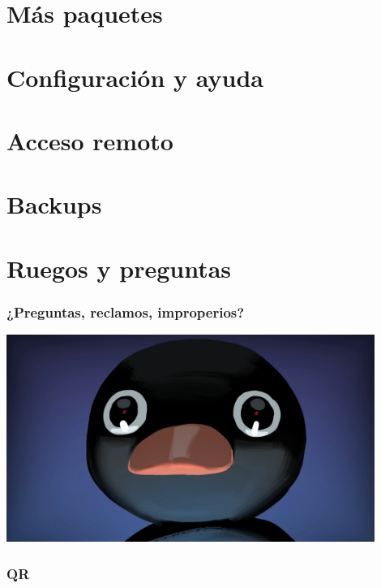 \documentclass[aspectratio=43]{beamer}
\begin{document}
\begin{frame}
    \frametitle{}
    
\end{frame}


\section{Más paquetes}

\begin{frame}
    \frametitle{}
    
\end{frame}


\section{Configuración y ayuda}

\begin{frame}
    \frametitle{}
    
\end{frame}


\section{Acceso remoto}


\begin{frame}
    \frametitle{}
    
\end{frame}



\section{Backups}

\begin{frame}
    \frametitle{}
    
\end{frame}


\section{Ruegos y preguntas}

\begin{frame}
    \frametitle{¿Preguntas, reclamos, improperios?}
    \centering
    \includegraphics[width=0.9\textwidth]{img/noot.png}
\end{frame}


\begin{frame}
    \frametitle{QR}
    
\end{frame}
\end{document}

